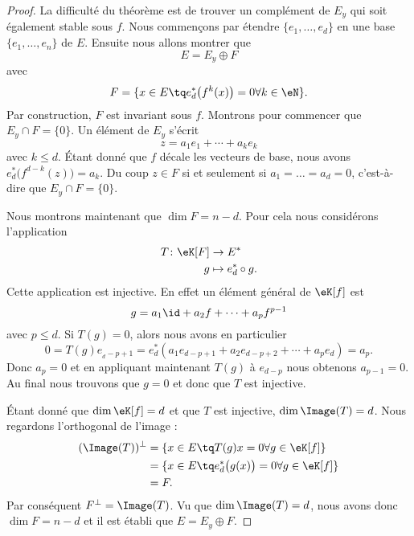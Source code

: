 \begin{proof}
    La difficulté du théorème est de trouver un complément de \( E_y\) qui soit également stable sous \( f\). Nous commençons par étendre \( \{ e_1,\ldots, e_d \}\) en une base \( \{ e_1,\ldots, e_n \}\) de \( E\). Ensuite nous allons montrer que
    \begin{equation}
        E=E_y\oplus F
    \end{equation}
    avec
    \begin{equation}
        F=\{ x\in E\tq  e^*_d\big( f^k(x) \big)=0\forall k\in \eN \}.
    \end{equation}
    Par construction, \( F\) est invariant sous \( f\). Montrons pour commencer que \( E_y\cap F=\{ 0 \}\). Un élément de \( E_y\) s'écrit
    \begin{equation}
        z=a_1e_1+\cdots +a_ke_k
    \end{equation}
    avec \( k\leq d\). Étant donné que \( f\) décale les vecteurs de base, nous avons \( e^*_d\big( f^{d-k}(z) \big)=a_k\). Du coup \( z\in F\) si et seulement si \( a_1=\ldots=a_d=0\), c'est-à-dire que \( E_y\cap F=\{ 0 \}\).

    Nous montrons maintenant que \( \dim F=n-d\). Pour cela nous considérons l'application
    \begin{equation}
        \begin{aligned}
            T\colon \eK[F]&\to E^* \\
            g&\mapsto e^*_d\circ g.
        \end{aligned}
    \end{equation}
    Cette application est injective. En effet un élément général de \( \eK[f]\) est
    \begin{equation}
        g=a_1\id+a_2f+\cdots +a_pf^{p-1}
    \end{equation}
    avec \( p\leq d\). Si \( T(g)=0\), alors nous avons en particulier
    \begin{equation}
        0=T(g)e_{_d-p+1}=e^*_d(a_1e_{d-p+1}+a_2e_{d-p+2}+\cdots +a_pe_d)=a_p.
    \end{equation}
    Donc \( a_p=0\) et en appliquant maintenant \( T(g)\) à \( e_{d-p}\) nous obtenons \( a_{p-1}=0\). Au final nous trouvons que \( g=0\) et donc que \( T\) est injective.

    Étant donné que \( \dim\eK[f]=d\) et que \( T\) est injective, \( \dim\Image(T)=d\). Nous regardons l'orthogonal de l'image :
    \begin{subequations}
        \begin{align}
            (\Image(T))^{\perp}&=\{ x\in E\tq T(g)x=0\forall g\in\eK[f] \}\\
            &=\{ x\in E\tq e^*_d\big( g(x) \big)=0\forall g\in \eK[f] \}\\
            &=F.
        \end{align}
    \end{subequations}
    Par conséquent \( F^{\perp}=\Image(T)\). Vu que \( \dim\Image(T)=d\), nous avons donc \( \dim F=n-d\) et il est établi que \( E=E_y\oplus F\).


\end{proof}
